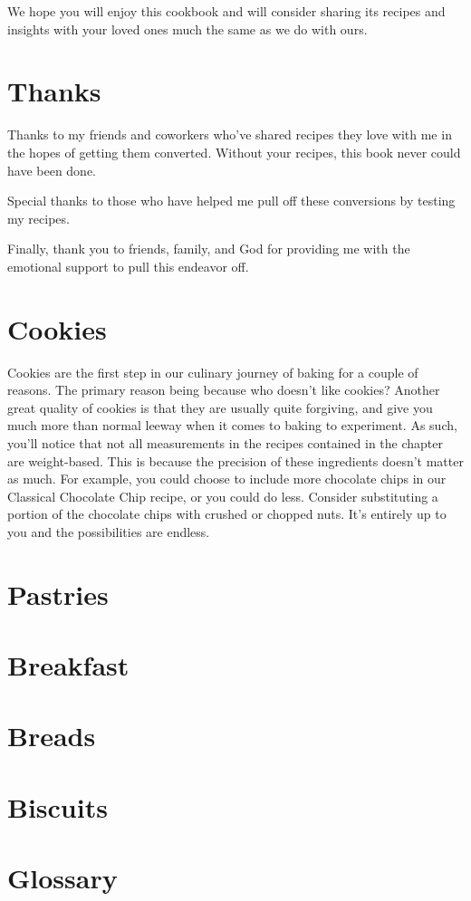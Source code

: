 \documentclass[titlepage]{article}
\begin{document}
\noindent We hope you will enjoy this cookbook and will consider sharing its recipes and insights with your loved ones much the same as we do with ours.
\section*{Thanks}
Thanks to my friends and coworkers who've shared recipes they love with me in the hopes of getting them converted. Without your recipes, this book never could have been done.
\vspace{\baselineskip}

\noindent Special thanks to those who have helped me pull off these conversions by testing my recipes.
\vspace{\baselineskip}

\noindent Finally, thank you to friends, family, and God for providing me with the emotional support to pull this endeavor off.
\pagebreak
\section{Cookies}
Cookies are the first step in our culinary journey of baking for a couple of reasons. The primary reason being because who doesn't like cookies? Another great quality of cookies is that they are usually quite forgiving, and give you much more than normal leeway when it comes to baking to experiment. As such, you'll notice that not all measurements in the recipes contained in the chapter are weight-based. This is because the precision of these ingredients doesn't matter as much. For example, you could choose to include more chocolate chips in our Classical Chocolate Chip recipe, or you could do less. Consider substituting a portion of the chocolate chips with crushed or chopped nuts. It's entirely up to you and the possibilities are endless.

\pagebreak
\section{Pastries}
\pagebreak
\section{Breakfast}
\pagebreak
\section{Breads}
\pagebreak
\section{Biscuits}
\pagebreak
\section*{Glossary}
\end{document}
